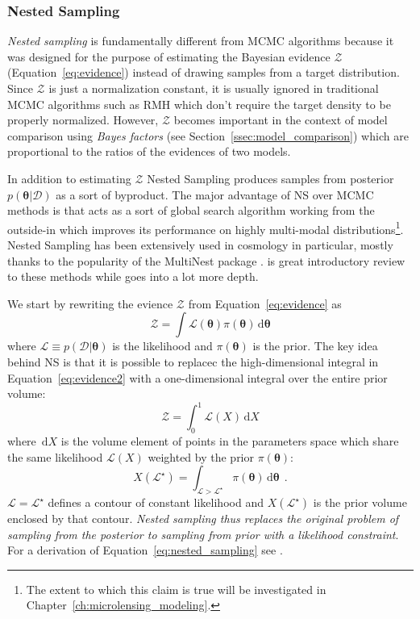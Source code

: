 \documentclass[12pt,dvipsnames]{report}
\newcommand{\ud}{\,\mathrm{d}}
\newcommand{\ssf}[1]{\textsf{#1}}
\renewcommand{\vec}[1]{\boldsymbol{\mathbf{#1}}}
\newcommand{\hquad}{~~}
\begin{document}
\subsubsection{Nested Sampling}
\textsl{Nested sampling} \citep{2004AIPC..735..395S}  is fundamentally different 
from MCMC algorithms  because it was designed for the purpose  of estimating the
Bayesian evidence  $\mathcal{Z}$ (Equation~\ref{eq:evidence}) instead of drawing samples 
from  a target distribution.
Since $\mathcal{Z}$ is just a normalization constant, it is usually ignored 
in traditional MCMC algorithms such as RMH which don't require the target 
density to be properly normalized.
However, $\mathcal{Z}$  becomes important in the context of model comparison 
using \textsl{Bayes factors} (see Section~\ref{ssec:model_comparison}) which
are proportional to the ratios of the evidences of two models. 

In addition to estimating $\mathcal{Z}$ Nested Sampling produces samples 
from posterior $p(\vec\theta\lvert \mathcal{D})$ as a sort of byproduct. 
The major advantage of NS over MCMC methods is that acts as a sort of 
global search algorithm working from the outside-in which improves its 
performance on highly multi-modal distributions\footnote{
    The extent to which this claim is true will be investigated in 
    Chapter~\ref{ch:microlensing_modeling}.
}. Nested Sampling has been extensively used in cosmology in particular, mostly 
thanks to the popularity of the \ssf{MultiNest} package \citep{arXiv:0809.3437}. 
\citet{arXiv:2205.15570} is great introductory review to these methods while 
\citet{arXiv:2101.09675} goes into a lot more depth.

We start by rewriting the evience $\mathcal{Z}$ from Equation~\ref{eq:evidence}
as 
\begin{equation}
\mathcal{Z}=\int \mathcal{L}(\vec\theta) \pi(\vec \theta)\ud\vec\theta
\label{eq:evidence2}
\end{equation}
where  $\mathcal{L}\equiv p(\mathcal{D}\lvert\vec \theta)$ is the likelihood 
and $\pi(\vec \theta)$ is the prior. The key idea behind NS is that it is possible 
to replacec the high-dimensional integral in Equation~\ref{eq:evidence2} with 
a one-dimensional integral over the entire prior volume: 
\begin{equation}
    \mathcal{Z}=\int_{0}^{1} \mathcal{L}(X) \ud X
    \label{eq:nested_sampling}
\end{equation}
where $\ud X$ is the volume element of points in the parameters space which 
share the same likelihood $\mathcal{L}(X)$ weighted by the prior $\pi(\vec\theta)$:
\begin{equation}
X\left(\mathcal{L}^{\star}\right)=\int_{\mathcal{L}>\mathcal{L}^{\star}} \pi(\vec\theta) \ud \vec\theta\hquad .
\end{equation}
$\mathcal{L}=\mathcal{L}^\star$ defines a contour of constant likelihood and 
$X(\mathcal{L}^\star)$ is the prior volume enclosed by that contour.
\emph{Nested sampling thus replaces the original problem of sampling from the posterior 
to  sampling from prior with a likelihood constraint}.
For a derivation of Equation~\ref{eq:nested_sampling} see \citet{arXiv:2205.15570}.
\end{document}
